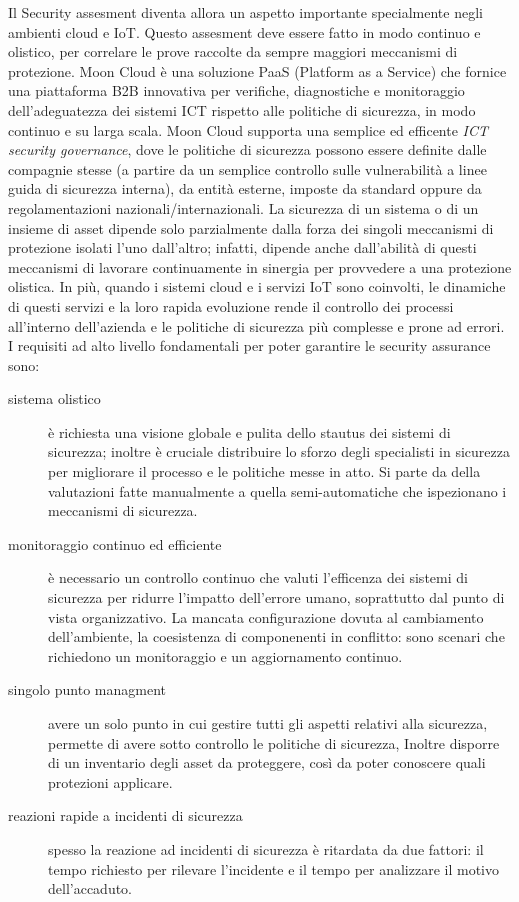 Il Security assesment diventa allora un aspetto importante specialmente negli ambienti cloud e IoT. Questo 
assesment deve essere fatto in modo continuo e olistico, per correlare le prove raccolte da sempre maggiori 
meccanismi di protezione. \cite{mooncloud-semi-automatic-and-trustworthy}
\newline
Moon Cloud è una soluzione PaaS (Platform as a Service) che fornice una piattaforma B2B innovativa per verifiche, 
diagnostiche e monitoraggio dell'adeguatezza dei sistemi ICT rispetto alle politiche di sicurezza, in modo continuo 
e su larga scala.
Moon Cloud supporta una semplice ed efficente \textit{ICT security governance}, dove le politiche di sicurezza possono
essere definite dalle compagnie stesse (a partire da un semplice controllo sulle vulnerabilità a linee guida di
sicurezza interna), da entità esterne, imposte da standard oppure da regolamentazioni nazionali/internazionali.
\newline
La sicurezza di un sistema o di un insieme di asset dipende solo parzialmente dalla forza dei
singoli meccanismi di protezione isolati l'uno dall'altro; infatti, dipende anche dall'abilità di questi meccanismi 
di lavorare continuamente in sinergia per provvedere a una protezione olistica.
In più, quando i sistemi cloud e i servizi IoT sono coinvolti, le dinamiche di questi servizi e la loro rapida 
evoluzione rende il controllo dei processi all'interno dell'azienda e le politiche di sicurezza 
più complesse e prone ad errori.
\newline
I requisiti ad alto livello fondamentali per poter garantire le security assurance sono:
\begin{description}
	\item[sistema olistico] è richiesta una visione globale e pulita dello stautus dei sistemi di sicurezza; 
	inoltre è cruciale distribuire lo sforzo degli specialisti in sicurezza per migliorare il processo e le 
	politiche messe in atto. Si parte da della valutazioni fatte manualmente a quella semi-automatiche che
	ispezionano i meccanismi di sicurezza. 
	\item[monitoraggio continuo ed efficiente] è necessario un controllo continuo che valuti l'efficenza dei 
	sistemi di sicurezza per ridurre l'impatto dell'errore umano, soprattutto dal punto di vista organizzativo.
	La mancata configurazione dovuta al cambiamento dell'ambiente, la coesistenza di componenenti in conflitto: 
	sono scenari che richiedono un monitoraggio e un aggiornamento continuo.
	\item[singolo punto managment] avere un solo punto in cui gestire tutti gli aspetti relativi alla sicurezza,
	permette di avere sotto controllo le politiche di sicurezza, Inoltre disporre di un inventario degli asset 
	da proteggere, così da poter conoscere quali protezioni applicare.
	\item[reazioni rapide a incidenti di sicurezza] spesso la reazione ad incidenti di sicurezza è ritardata 
	da due fattori: il tempo richiesto per rilevare l'incidente e il tempo per analizzare il motivo dell'accaduto.
\end{description}


